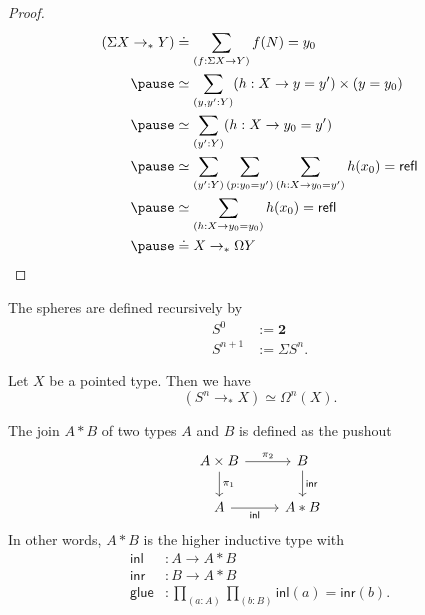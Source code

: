 \documentclass[handout]{beamer}
\newcommand{\sphere}[1]{S^{#1}}
\newcommand{\refl}{\mathsf{refl}}
\newcommand{\inl}{\mathsf{inl}}
\newcommand{\inr}{\mathsf{inr}}
\newcommand{\glue}{\mathsf{glue}}
\begin{document}
\begin{frame}
  \begin{proof}
    \begin{align*}
      (\Sigma X \to_\ast Y)
      & \doteq \sum_{(f:\Sigma X\to Y)}f(N)=y_0 \\ \pause
      & \simeq \sum_{(y,y':Y)}(h:X\to y=y')\times (y=y_0) \\ \pause
      & \simeq \sum_{(y':Y)}(h:X\to y_0=y') \\ \pause
      & \simeq \sum_{(y':Y)}\sum_{(p:y_0=y')}\sum_{(h:X\to y_0=y')}h(x_0)=\refl \\ \pause
      & \simeq \sum_{(h:X\to y_0=y_0)}h(x_0)=\refl \\ \pause
      & \doteq X\to_\ast \Omega Y\qedhere
    \end{align*}
  \end{proof}
\end{frame}

\begin{frame}
    \begin{definition}
    The spheres are defined recursively by
    \begin{align*}
      \sphere{0} & := \mathbf{2} \\
      \sphere{n+1} & :=\Sigma\sphere{n}.
    \end{align*}
  \end{definition}

  \begin{theorem}
    Let $X$ be a pointed type. Then we have
    \begin{equation*}
      (\sphere{n}\to_\ast X)\simeq \Omega^n(X).
    \end{equation*}
  \end{theorem}
\end{frame}

\begin{frame}
  \begin{definition}
    The join $A\ast B$ of two types $A$ and $B$ is defined as the pushout
    \begin{equation*}
      \begin{tikzcd}[ampersand replacement=\&]
        A\times B \arrow[d,"\pi_1"] \arrow[r,"\pi_2"] \& B \arrow[d,"\inr"] \\
        A \arrow[r,swap,"\inl"] \& A\ast B
      \end{tikzcd}
    \end{equation*}
    In other words, $A\ast B$ is the higher inductive type with
    \begin{align*}
      \inl & : A \to A \ast B \\
      \inr & : B \to A \ast B \\
      \glue & : \prod_{(a:A)}\prod_{(b : B)}\inl(a)=\inr(b).
    \end{align*}
  \end{definition}
\end{frame}
\end{document}
